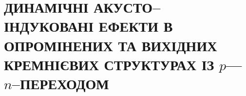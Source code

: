 
\chapter{\MakeUppercase{Динамічні акусто--індуковані ефекти в опромінених та вихідних кремнієвих структурах із} $p$---$n$--\MakeUppercase{переходом}\label{Ch_SSC}}


%
%
